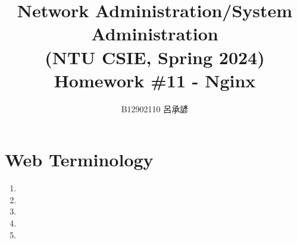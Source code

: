 \documentclass[12pt, a4paper]{article}
\title{
  \vspace{-1cm}
  Network Administration/System Administration\\
  (NTU CSIE, Spring 2024)\\
  Homework \#11 - Nginx
}
\author{\Large B12902110 呂承諺}
\begin{document}
  \maketitle

  \section*{Web Terminology}
  \begin{enumerate}
    \item

    \item

    \item

    \item

    \item
  \end{enumerate}
\end{document}
